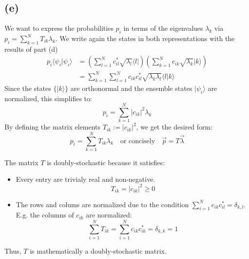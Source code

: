 \documentclass{article}
\begin{document}
\subsection*{(e)}
We want to express the probabilities $p_i$ in terms of the eigenvalues $\lambda_k$ via $p_i = \sum_{k=1}^N T_{ik} \lambda_k$.
We write again the states in both representations with the results of part (d)
\begin{align}
    p_i \langle \psi_i | \psi_i \rangle &= \left( \sum_{l=1}^N c_{il}^* \sqrt{\lambda_l} \langle l | \right) \left( \sum_{k=1}^N c_{ik} \sqrt{\lambda_k} |k\rangle \right) \\
    &= \sum_{k=1}^N \sum_{l=1}^N c_{ik} c_{il}^* \sqrt{\lambda_k \lambda_l} \langle l | k \rangle
\end{align}
Since the states $\{|k\rangle\}$ are orthonormal and the ensemble states $| \psi_i \rangle$ are normalized, this simplifies to:
\begin{equation}
    p_i = \sum_{k=1}^N |c_{ik}|^2 \lambda_k
\end{equation}
By defining the matrix elements $T_{ik} := |c_{ik}|^2$, we get the desired form:
\begin{equation}
    p_i = \sum_{k=1}^N T_{ik} \lambda_k \quad \text{or concisely} \quad \vec{p} = T \vec{\lambda}
\end{equation}

The matrix $T$ is doubly-stochastic because it satisfies:
\begin{itemize}
    \item Every entry are trivialy real and non-negative.
    \begin{equation}
        T_{ik} = |c_{ik}|^2 \ge 0
    \end{equation}
    \item The rows and colums are normalized due to the condition $\sum_{i=1}^N c_{ik} c_{il}^* = \delta_{k,l}$. E.g. the columns of $c_{ik}$ are normalized:
    \begin{equation}
        \sum_{i=1}^N T_{ik} = \sum_{i=1}^N c_{ik} c_{ik}^* = \delta_{k,k} = 1
    \end{equation}
\end{itemize}
Thus, $T$ is mathematically a doubly-stochastic matrix.
\end{document}
